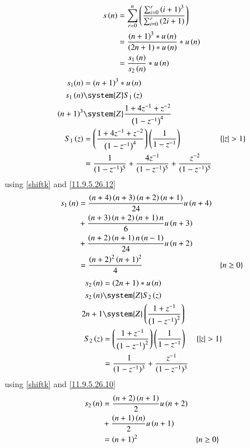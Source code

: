 \documentclass[journal,12pt,twocolumn]{article}
\begin{document}
\begin{align}
    s\left(n\right) & = \sum_{r=0}^{n}\left(\frac{\sum_{i=0}^{r} \left(i+1\right)^{3}}{\sum_{i=0}^{r} \left(2i+1\right)}\right) \\
    & = \frac{\left(n+1\right)^3 * u\left(n\right)}{\left(2n+1\right) * u\left(n\right)} * u\left(n\right) \\
    & = \frac{s_1\left(n\right)}{s_2\left(n\right)} * u\left(n\right)\label{9.5.25.1}
\end{align}
\begin{align}
    s_1(n) & = \brak{n+1}^{3} * u\brak{n}\\
    s_1\brak{n} & \system{Z} S_1\brak{z}\\
    \brak{n+1}^3 & \system{Z} \frac{1 + 4z^{-1} + z^{-2}}{\brak{1-z^{-1}}^4}\\ 
    S_1\brak{z} & = \brak{\frac{1 + 4z^{-1} + z^{-2}}{\brak{1-z^{-1}}^4}} \brak{\frac{1}{1-z^{-1}}} & \cbrak{|z| > 1}\\
    & = \frac{1}{(1 - z^{-1})^5} + \frac{4 z^{-1}}{(1 - z^{-1})^5} + \frac{z^{-2}}{(1 - z^{-1})^5}
\end{align}
using \eqref{shiftk} and \eqref{11.9.5.26.12}
\begin{align}
    s_1\left(n\right) & = \frac{\left(n + 4\right) \left(n + 3\right) \left(n + 2\right) \left(n + 1\right)}{24}u\left(n+4\right)\notag\\
    & + \frac{\left(n + 3\right) \left(n + 2\right) \left(n + 1\right) n}{6}u\left(n+3\right)\notag\\
    & + \frac{\left(n + 2\right) \left(n + 1\right) n \left(n - 1\right)}{24}u\left(n+2\right)\\
    & = \frac{\left(n+2\right)^2\left(n+1\right)^2}{4} & \left\{n\geq0\right\}\label{9.5.25.2}
\end{align}
\begin{align}
    s_2\brak{n} & = \brak{2n+1} * u\brak{n}\\
    s_2\brak{n} & \system{Z} S_2\brak{z}\\
    2n+1 & \system{Z} \brak{\frac{1 + z^{-1}}{\brak{1-z^{-1}}^2}}\\  
    S_2\brak{z} & = \brak{\frac{1 + z^{-1}}{\brak{1-z^{-1}}^2}} \brak{\frac{1}{1-z^{-1}}} & \cbrak{|z| > 1}\\
    & = \frac{1}{(1 - z^{-1})^3} + \frac{z^{-1}}{(1 - z^{-1})^3}
\end{align}
using \eqref{shiftk} and \eqref{11.9.5.26.10}
\begin{align}
    s_2\left(n\right) & = \frac{\left(n + 2\right) \left(n + 1\right)}{2}u\left(n+2\right)\notag\\
    & + \frac{\left(n + 1\right) \left(n\right) }{2}u\left(n+1\right)\\
    & = \left(n+1\right)^2 & \left\{n\geq0\right\} \label{9.5.25.3}
\end{align}
\end{document}
